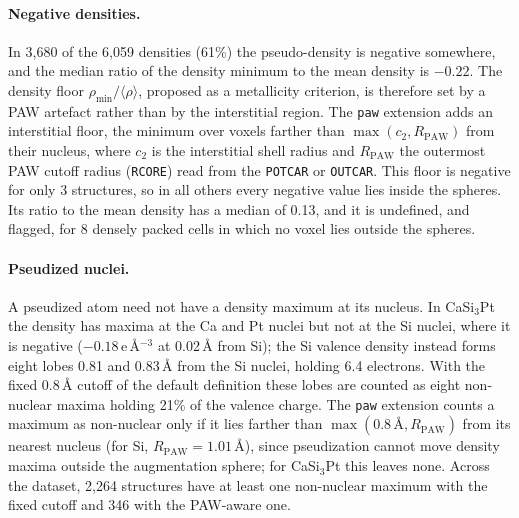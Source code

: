 \documentclass[11pt,a4paper]{article}
\begin{document}
\paragraph{Negative densities.} In 3,680 of the 6,059 densities (61\%) the
pseudo-density is negative somewhere, and the median ratio of the density
minimum to the mean density is $-0.22$. The density floor
$\rho_{\min}/\langle\rho\rangle$, proposed as a metallicity criterion, is
therefore set by a PAW artefact rather than by the interstitial region.
The \texttt{paw} extension adds an interstitial floor, the minimum over voxels
farther than $\max(c_2, R_{\mathrm{PAW}})$ from their nucleus, where $c_2$ is
the interstitial shell radius and $R_{\mathrm{PAW}}$ the outermost PAW cutoff
radius (\texttt{RCORE}) read from the \texttt{POTCAR} or \texttt{OUTCAR}. This
floor is negative for only 3 structures, so in all others every negative value
lies inside the spheres. Its ratio to the mean density has a median of 0.13,
and it is undefined, and flagged, for 8 densely packed cells in which no voxel
lies outside the spheres.

\paragraph{Pseudized nuclei.} A pseudized atom need not have a density maximum
at its nucleus. In CaSi$_3$Pt the density has maxima at the Ca and Pt nuclei
but not at the Si nuclei, where it is negative ($-0.18$\,e\,\AA$^{-3}$ at
0.02\,\AA{} from Si); the Si valence density instead forms eight lobes 0.81 and
0.83\,\AA{} from the Si nuclei, holding 6.4 electrons. With the fixed
0.8\,\AA{} cutoff of the default definition these lobes are counted as eight
non-nuclear maxima holding 21\% of the valence charge. The \texttt{paw}
extension counts a maximum as non-nuclear only if it lies farther than
$\max(0.8\,\text{\AA}, R_{\mathrm{PAW}})$ from its nearest nucleus (for Si,
$R_{\mathrm{PAW}} = 1.01$\,\AA), since pseudization cannot move density maxima
outside the augmentation sphere; for CaSi$_3$Pt this leaves none. Across the
dataset, 2,264 structures have at least one non-nuclear maximum with the fixed
cutoff and 346 with the PAW-aware one.
\end{document}
